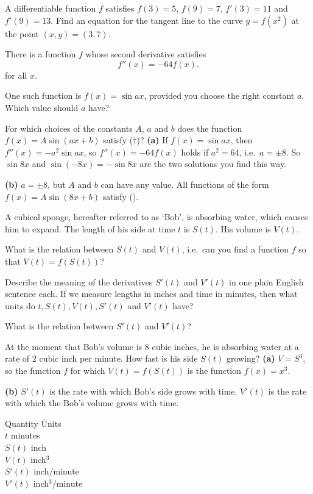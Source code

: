 \begin{multicols}{2}
\problem  A differentiable function $f$ satisfies $f(3)=5$, $f(9)=7$,
$f'(3)=11$ and $f'(9)=13$.  Find an equation for the tangent line
to the curve $y=f(x^2)$ at the point $(x,y)=(3,7)$.


\problem There is a function $f$ whose second derivative satisfies
\begin{equation}
  f''(x) = -64 f(x).\tag{\dag}
\end{equation}
for all $x$.

\subprob  One such function is $f(x) = \sin ax$, provided you choose the
right constant $a$. Which value should $a$ have?

\subprob  For which choices of the constants $A$, $a$ and $b$ does the 
function $f(x) = A\sin (ax+b)$ satisfy ($\dag$)?
\answer
\textbf{(a)} If $f(x) = \sin ax$, then $f''(x) = -a^2 \sin ax$, so
$f''(x) = -64f(x)$ holds if $a^2 = 64$, i.e.~$a=\pm 8$.  So $\sin 8x
$ and $\sin(-8x) = -\sin 8x$ are the two solutions you find this
way.  

\textbf{(b)} $a=\pm8$, but $A$ and $b$ can have any value.  All
functions of the form $f(x) =  A \sin(8x+b)$ satisfy (\dag).
\endanswer 


\problem \groupproblem A cubical sponge, hereafter referred to as `Bob', is
absorbing water, which causes him to expand.  The length of his side at
time $t$ is $S(t)$.  His volume is $V(t)$.

\subprob  What is the relation between $S(t)$ and $V(t)$, i.e.\ can you
find a function $f$ so that $V(t) = f(S(t))$?

\subprob  Describe the meaning of the derivatives $S'(t)$ and $V'(t)$ in
one plain English sentence each.  If we measure lengths in inches and time
in minutes, then what units do $t, S(t), V(t), S'(t)$ and $V'(t)$ have?

\subprob  What is the relation between $S'(t)$ and $V'(t)$?  

\subprob  At the moment that Bob's volume is 8 cubic inches, he is
absorbing water at a rate of $2$ cubic inch per minute.  How fast is his
side $ S(t) $ growing?
\answer
\textbf{(a)} $V=S^3$, so the function $f$ for which $V(t)=f(S(t))$
is the function $f(x) = x^3$.

\textbf{(b)} $S'(t)$ is the rate with which Bob's side grows with
time.  $V'(t)$ is the rate with which the Bob's volume grows with
time.
\begin{tabbing}
  Quantity \hspace{2ex}\= Units \\
  $t$ \> minutes\\
  $S(t)$ \> inch \\
  $V(t)$ \> inch$^3$ \\
  $S'(t)$ \> inch$/$minute \\
  $V'(t)$ \> inch$^3/$minute
\end{tabbing}


\end{multicols}

